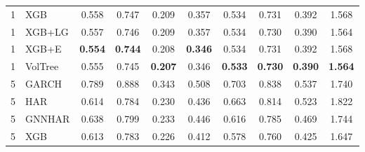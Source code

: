 \documentclass[runningheads]{llncs}
\begin{document}
\begin{table}[t]
\begin{tabular}{ll cccc cccc}
1 & XGB      & 0.558 & 0.747 & 0.209 & 0.357 & 0.534 & 0.731 & 0.392 & 1.568 \\ %
1 & XGB+LG   & 0.557 & 0.746 & 0.209 & 0.357 & 0.534 & 0.730 & 0.390 & 1.564 \\ %
1 & XGB+E    & \textbf{0.554} & \textbf{0.744} & 0.208 & \textbf{0.346} & 0.534 & 0.731 & 0.392 & 1.568 \\ %
1 & VolTree & 0.555 & 0.745 & \textbf{0.207} & 0.346 & \textbf{0.533} & \textbf{0.730} & \textbf{0.390} & \textbf{1.564} \\ %
\midrule
5 & GARCH    & 0.789 & 0.888 & 0.343 & 0.508 & 0.703 & 0.838 & 0.537 & 1.740 \\ %
5 & HAR      & 0.614 & 0.784 & 0.230 & 0.436 & 0.663 & 0.814 & 0.523 & 1.822 \\ %
5 & GNNHAR   & 0.638 & 0.799 & 0.233 & 0.446 & 0.616 & 0.785 & 0.469 & 1.744 \\ %
5 & XGB      & 0.613 & 0.783 & 0.226 & 0.412 & 0.578 & 0.760 & 0.425 & 1.647 \\ %

\end{tabular}
\end{table}
\end{document}
